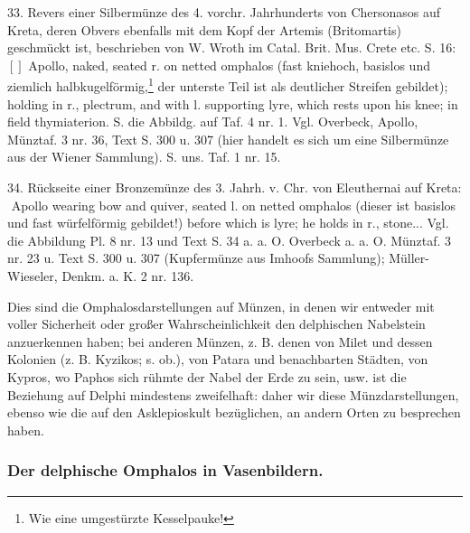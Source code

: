 \documentclass[a4paper, 11pt, oneside]{article}
\newcommand*\svgABB{}
\newcommand*\svgABC{}
\newcommand*\svgABD{}
\begin{document}
33. Revers einer Silbermünze des 4. vorchr. Jahrhunderts von Chersonasos auf Kreta, deren Obvers ebenfalls mit dem Kopf der Artemis (Britomartis) geschmückt ist, beschrieben von W. Wroth im Catal. Brit. Mus. Crete etc. S. 16: $\svgABB[\svgABC]$ Apollo, naked, seated r. on netted omphalos (fast kniehoch, basislos und ziemlich halbkugelförmig,\footnote{Wie eine umgestürzte Kesselpauke!} der unterste Teil ist als deutlicher Streifen gebildet); holding in r., plectrum, and with l. supporting lyre, which rests upon his knee; in field thymiaterion. S. die Abbildg. auf Taf. 4 nr. 1. Vgl. Overbeck, Apollo, Münztaf. 3 nr. 36, Text S. 300 u. 307 (hier handelt es sich um eine Silbermünze aus der Wiener Sammlung). S. uns. Taf. 1 nr. 15.

34. Rückseite einer Bronzemünze des 3. Jahrh. v. Chr. von Eleuthernai auf Kreta: $\svgABD$ Apollo wearing bow and quiver, seated l. on netted omphalos (dieser ist basislos und fast würfelförmig gebildet!) before which is lyre; he holds in r., stone... Vgl. die Abbildung Pl. 8 nr. 13 und Text S. 34 a. a. O. Overbeck a. a. O. Münztaf. 3 nr. 23 u. Text S. 300 u. 307 (Kupfermünze aus Imhoofs Sammlung); Müller-Wieseler, Denkm. a. K. 2 nr. 136.

Dies sind die Omphalosdarstellungen auf Münzen, in denen wir entweder mit voller Sicherheit oder großer Wahrscheinlichkeit den delphischen Nabelstein anzuerkennen haben; bei anderen Münzen, z. B. denen von Milet und dessen Kolonien (z. B. Kyzikos; s. ob.), von Patara und benachbarten Städten, von Kypros, wo Paphos sich rühmte der Nabel der Erde zu sein, usw. ist die Beziehung auf Delphi mindestens zweifelhaft: daher wir diese Münzdarstellungen, ebenso wie die auf den Asklepioskult bezüglichen, an andern Orten zu besprechen haben.

\subsubsection{Der delphische Omphalos in Vasenbildern.}
\end{document}
